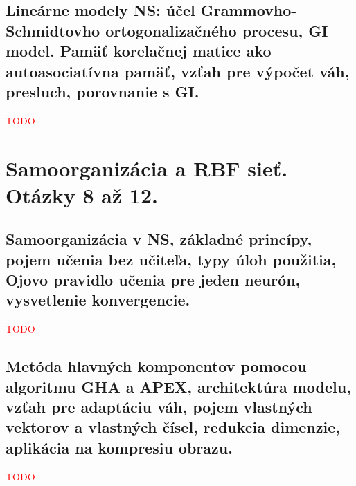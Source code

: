 \documentclass{article}
\numberwithin{equation}{section} %
\begin{document}
\subsection{Lineárne modely NS: účel Grammovho-Schmidtovho ortogonalizačného procesu, GI model. Pamäť korelačnej matice ako autoasociatívna pamäť, vzťah pre výpočet váh, presluch, porovnanie s GI.}
\textcolor{red}{TODO}


\section{Samoorganizácia a RBF sieť. Otázky 8 až 12.}
\subsection{Samoorganizácia v NS, základné princípy, pojem učenia bez učiteľa, typy úloh použitia, Ojovo pravidlo učenia pre jeden neurón, vysvetlenie konvergencie.}
\textcolor{red}{TODO}


\subsection{Metóda hlavných komponentov pomocou algoritmu GHA a APEX, architektúra modelu, vzťah pre adaptáciu váh, pojem vlastných vektorov a vlastných čísel, redukcia dimenzie, aplikácia na kompresiu obrazu.}
\textcolor{red}{TODO}
\end{document}

